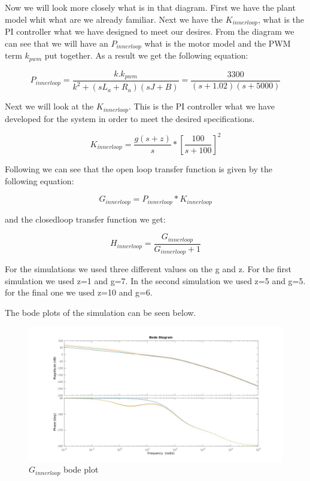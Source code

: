 Now we will look more closely what is in that diagram. First we have the plant model whit what are we already familiar. Next we have the $K_{innerloop}$, what is the PI controller what we have designed to meet our desires. From the diagram we can see that we will have an $P_{innerloop}$ what is the motor model and the PWM term $k_{pwm}$ put together. As a result we get the following equation:

\begin{equation}
P_{innerloop}=\frac{k.k_{pwm}}{k^2+(sL_{a}+R_{a})(sJ+B)}=\frac{3300}{(s+1.02)(s+5000)}
\end{equation}

Next we will look at the $K_{innerloop}$. This is the PI controller what we have developed for the system in order to meet the desired specifications. 

\begin{equation}
K_{innerloop}=\frac{g(s+z)}{s}*[\frac{100}{s+100}]^2
\end{equation} 

Following we can see that the open loop transfer function is given by the following equation:

\begin{equation}
G_{innerloop}=P_{innerloop}*K_{innerloop}
\end{equation}

and the closedloop transfer function we get:

\begin{equation}
H_{innerloop}=\frac{G_{innerloop}}{G_{innerloop}+1}
\end{equation}

For the simulations we used three different values on the g and z. For the first simulation we used z=1 and g=7. In the second simulation we used z=5 and g=5. for the final one we used z=10 and g=6.

The bode plots of the simulation can be seen below.

\begin{figure}
\centering
 	\includegraphics[width=1\textwidth]{figures/Ginnerbode.jpg}
	
	
	\caption{$G_{innerloop}$ bode plot} 
 	\label{fig:ginnerloopbode} 
\end{figure}

